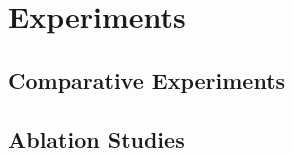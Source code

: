 \section{Experiments}
\label{sec:experiments}




\subsection{Comparative Experiments}
\label{subsec:comparative-experiments}


\subsection{Ablation Studies}
\label{subsec:ablation-studies}






